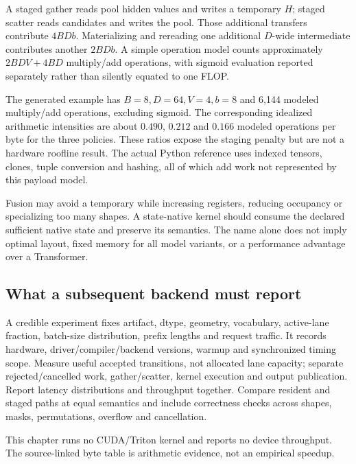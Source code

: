 A staged gather reads pool hidden values and writes a temporary $H$; staged
scatter reads candidates and writes the pool. Those additional transfers
contribute $4BDb$. Materializing and rereading one additional $D$-wide
intermediate contributes another $2BDb$. A simple operation model counts
approximately $2BDV+4BD$ multiply/add operations, with sigmoid evaluation
reported separately rather than silently equated to one FLOP.

\begin{center}\end{center}

The generated example has $B=8,D=64,V=4,b=8$ and 6,144 modeled
multiply/add operations, excluding sigmoid. The corresponding idealized
arithmetic intensities are about $0.490$, $0.212$ and $0.166$ modeled
operations per byte for the three policies. These ratios expose the staging
penalty but are not a hardware roofline result. The actual Python reference
uses indexed tensors, clones, tuple conversion and hashing, all of which add
work not represented by this payload model.

Fusion may avoid a temporary while increasing registers, reducing occupancy
or specializing too many shapes. A state-native kernel should consume the
declared sufficient native state and preserve its semantics. The name alone
does not imply optimal layout, fixed memory for all model variants, or a
performance advantage over a Transformer.

\subsection{What a subsequent backend must report}
A credible experiment fixes artifact, dtype, geometry, vocabulary, active-lane
fraction, batch-size distribution, prefix lengths and request traffic.
It records hardware, driver/compiler/backend versions, warmup and synchronized
timing scope. Measure useful accepted transitions, not allocated lane capacity;
separate rejected/cancelled work, gather/scatter, kernel execution and output
publication. Report latency distributions and throughput together. Compare
resident and staged paths at equal semantics and include correctness checks
across shapes, masks, permutations, overflow and cancellation.

This chapter runs no CUDA/Triton kernel and reports no device throughput.
The source-linked byte table is arithmetic evidence, not an empirical speedup.

